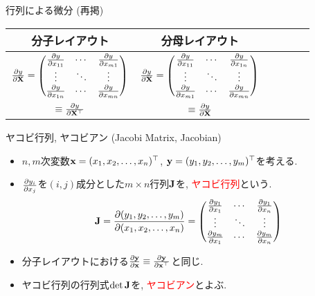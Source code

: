 \documentclass[dvipdfmx,notheorems,t]{beamer}
\begin{document}
\begin{frame}{行列による微分 (再掲)}
\begin{table}[h]
  \centering
  \begin{tabular}{ScSc}
    分子レイアウト & 分母レイアウト \\ \hline
    $\pdv{y}{\vb{X}} = \mqty(\pdv{y}{x_{11}} & \cdots & \pdv{y}{x_{m1}} \\
      \vdots & \ddots & \vdots \\
      \pdv{y}{x_{1n}} & \cdots & \pdv{y}{x_{mn}})$
      & $\pdv{y}{\vb{X}} = \mqty(\pdv{y}{x_{11}} & \cdots & \pdv{y}{x_{1n}} \\
        \vdots & \ddots & \vdots \\
        \pdv{y}{x_{m1}} & \cdots & \pdv{y}{x_{mn}})$ \\
      $\equiv \pdv{y}{\vb{X}^\top}$ & $\equiv \pdv{y}{\vb{X}}$
  \end{tabular}
\end{table}
\end{frame}

\begin{frame}{ヤコビ行列, ヤコビアン (Jacobi Matrix, Jacobian)}
\begin{itemize}
  \item $n, m$次変数$\vb{x} = (x_1, x_2, \ldots, x_n)^\top$, $\vb{y} = (y_1, y_2, \ldots, y_m)^\top$を考える.
  \item $\pdv{y_i}{x_j}$を$(i, j)$成分とした$m \times n$行列$\vb{J}$を, \textcolor{red}{ヤコビ行列}という.
  \begin{align*}
    \vb{J} = \pdv{(y_1, y_2, \ldots, y_m)}{(x_1, x_2, \ldots, x_n)}
      = \mqty(\pdv{y_1}{x_1} & \cdots & \pdv{y_1}{x_n} \\
        \vdots & \ddots & \vdots \\
        \pdv{y_m}{x_1} & \cdots & \pdv{y_m}{x_n})
  \end{align*}
  \item 分子レイアウトにおける$\pdv{\vb{y}}{\vb{x}} \equiv \pdv{\vb{y}}{\vb{x}^\top}$と同じ.
  \item ヤコビ行列の行列式$\det \vb{J}$を, \textcolor{red}{ヤコビアン}とよぶ.
\end{itemize}
\end{frame}
\end{document}
